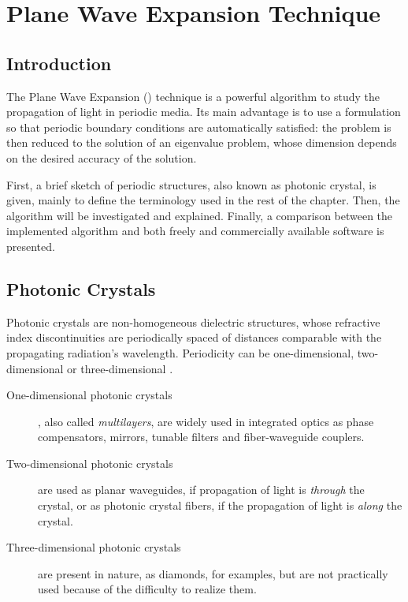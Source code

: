 \chapter{Plane Wave Expansion Technique} 

\section{Introduction}

The Plane Wave Expansion (\PWE) technique is a powerful algorithm to
study the propagation of light in periodic media. Its main advantage
is to use a formulation so that periodic boundary conditions are
automatically satisfied: the problem is then reduced to the solution
of an eigenvalue problem, whose dimension depends on the desired
accuracy of the solution.

First, a brief sketch of periodic structures, also known as photonic
crystal, is given, mainly to define the terminology used in the rest
of the chapter. Then, the \PWE algorithm will be investigated and
explained. Finally, a comparison between the implemented algorithm and
both freely and commercially available software is presented.

\section{Photonic Crystals} \label{sec:photonic_crystals}

Photonic crystals are non-homogeneous dielectric structures, whose
refractive index discontinuities are periodically spaced of distances
comparable with the propagating radiation's wavelength. Periodicity
can be one-dimensional, two-dimensional or three-dimensional
\cite{yablonovitch_photonic}.
\begin{description}
\item[One-dimensional photonic crystals], also called
  \emph{multilayers}, are widely used in integrated optics as phase
  compensators, mirrors, tunable filters and fiber-waveguide couplers.
\item[Two-dimensional photonic crystals] are used as planar
  waveguides, if propagation of light is \emph{through} the crystal,
  or as photonic crystal fibers, if the propagation of light is
  \emph{along} the crystal.
\item[Three-dimensional photonic crystals] are present in nature, as
  diamonds, for examples, but are not practically used because of the
  difficulty to realize them.
\end{description}

